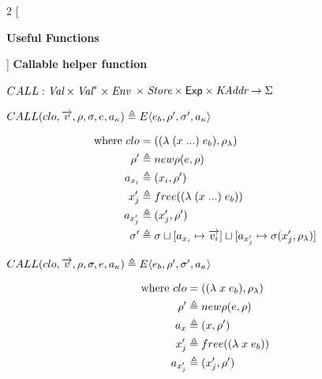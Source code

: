 \documentclass[12pt,draft]{article}
\newcommand{\E}[4]{E\langle #1 , #2 , #3 , #4 \rangle}
\begin{document}
\begin{multicols*}{2}
  [
  \begin{center}
    \textbf{Useful Functions}
  \end{center}
  ]
  \noindent
  \textbf{Callable helper function}
  \begin{center}
    $ CALL : \textit{Val} \times \textit{Val}^* \times \textit{Env}$
    $\times \; \textit{Store} \times \textsf{Exp} \times \textit{KAddr} \rightarrow \Sigma $ \\
  \end{center}
  \begin{center}
    $CALL(clo , \overrightarrow{v} , \cenv , \cstore , e, \ckaddr)
            \triangleq \E{e_b}{\cenv'}{\cstore'}{\ckaddr}$
  \end{center}
  \vspace{-7mm}
  \begin{align*}
    \text{where }
    clo &= ((\lambda \; (x \; ...) \; e_b) , \rho_{\lambda}) \\
    \rho' &\triangleq new\rho(e , \rho) \\
    a_{x_i} &\triangleq (x_i , \rho') \\
    x_j' &\triangleq free((\lambda \; (x \; ...) \; e_b)) \\
    a_{x_j'} &\triangleq (x_j' , \rho') \\
    \sigma' &\triangleq \sigma
               \sqcup [a_{x_i} \mapsto \overrightarrow{v_i}]
               \sqcup [a_{x_j'} \mapsto \sigma(x_j' , \rho_{\lambda})]
  \end{align*}
  \begin{center}
    $CALL(clo , \overrightarrow{v} , \cenv , \cstore , e , \ckaddr)
             \triangleq \E{e_b}{\cenv'}{\cstore'}{\ckaddr}$ \\
  \end{center}
  \vspace{-7mm}
  \begin{align*}
    \text{where }
    clo &= ((\lambda \; x \; e_b) , \cenv_{\lambda}) \\
    \cenv' &\triangleq \cnewenv(e , \cenv) \\
    a_x &\triangleq (x , \cenv') \\
    x_j' &\triangleq free((\lambda \; x \; e_b)) \\
    a_{x_j'} &\triangleq (x_j' , \cenv') \\

\end{align*}
\end{multicols*}
\end{document}
